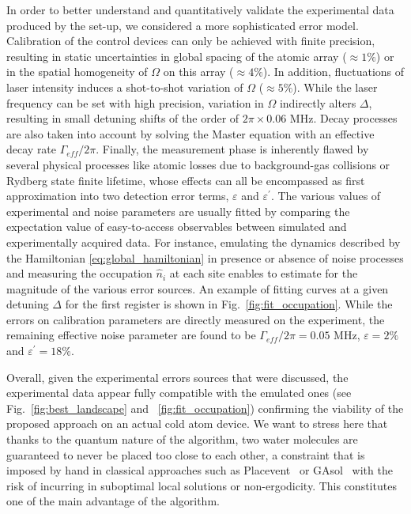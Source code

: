 \documentclass[fleqn,10pt]{wlscirep}
\begin{document}
In order to better understand and quantitatively validate the experimental data produced by the set-up, we considered a more sophisticated error model. Calibration of the control devices can only be achieved with finite precision, resulting in static uncertainties in global spacing of the atomic array ($\approx 1\%$) or in the spatial homogeneity of $\Omega$ on this array ($\approx 4\%$). In addition, fluctuations of laser intensity induces a shot-to-shot variation of $\Omega$ ($\approx 5\%$). While the laser frequency can be set with high precision, variation in $\Omega$ indirectly alters $\Delta$, resulting in small detuning shifts of the order of $2\pi\times 0.06$ MHz. Decay processes are also taken into account by solving the Master equation with an effective decay rate $\Gamma_{eff}/2\pi$. Finally, the measurement phase is inherently flawed by
several physical processes like atomic losses due to background-gas collisions or Rydberg state finite lifetime, whose effects can all be encompassed as first approximation into two detection error terms, $\varepsilon$ and $\varepsilon^\prime$. The various values of experimental and noise parameters are usually fitted by comparing the expectation value of easy-to-access observables between simulated and experimentally acquired data. For instance, emulating the dynamics described by the Hamiltonian \eqref{eq:global_hamiltonian} in presence or absence of noise processes and measuring the occupation $\hat{n}_i$ at each site enables to estimate for the magnitude of the various error sources. An example of fitting curves at a given detuning $\Delta$ for the first register is shown in Fig.~\ref{fig:fit_occupation}. While the errors on calibration parameters are directly measured on the experiment, the remaining effective noise parameter are found to be $\Gamma_{eff}/2\pi=0.05$ MHz, $\varepsilon=2\%$ and $\varepsilon^\prime=18\%$. 


Overall, given the experimental errors sources that were discussed, the experimental data appear fully compatible with the emulated ones (see Fig.~\ref{fig:best_landscape} and ~\ref{fig:fit_occupation}) confirming the viability of the proposed approach on an actual cold atom device.
We want to stress here that thanks to the quantum nature of the algorithm, two water molecules are guaranteed to never be placed too close to each other, a constraint that is imposed by hand in classical approaches such as Placevent~\cite{Placevent} or GAsol~\cite{fusani_optimal_2018}  with the risk of incurring in suboptimal local solutions or non-ergodicity. This constitutes one of the main advantage of the algorithm. 
\end{document}
